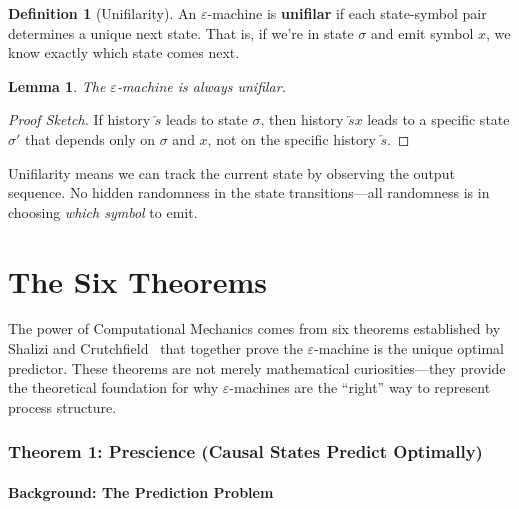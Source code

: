 \documentclass[11pt,a4paper]{article}
\theoremstyle{definition}
\newtheorem{definition}{Definition}[section]
\theoremstyle{plain}
\newtheorem{lemma}[theorem]{Lemma}
\newcommand{\eps}{\varepsilon}
\newcommand{\past}{\overleftarrow{s}}
\begin{document}
\begin{definition}[Unifilarity]
An $\eps$-machine is \textbf{unifilar} if each state-symbol pair determines a unique next state. That is, if we're in state $\sigma$ and emit symbol $x$, we know exactly which state comes next.
\end{definition}

\begin{lemma}
The $\eps$-machine is always unifilar.
\end{lemma}

\begin{proof}[Proof Sketch]
If history $\past$ leads to state $\sigma$, then history $\past x$ leads to a specific state $\sigma'$ that depends only on $\sigma$ and $x$, not on the specific history $\past$.
\end{proof}

\begin{keyidea}
Unifilarity means we can track the current state by observing the output sequence. No hidden randomness in the state transitions---all randomness is in choosing \emph{which symbol} to emit.
\end{keyidea}

\part{The Six Theorems}

The power of Computational Mechanics comes from six theorems established by Shalizi and Crutchfield~\cite{shalizi2001computational} that together prove the $\eps$-machine is the unique optimal predictor. These theorems are not merely mathematical curiosities---they provide the theoretical foundation for why $\eps$-machines are the ``right'' way to represent process structure.

\section{Theorem 1: Prescience (Causal States Predict Optimally)}
\label{sec:theorem-prescience}

\subsection{Background: The Prediction Problem}
\end{document}
